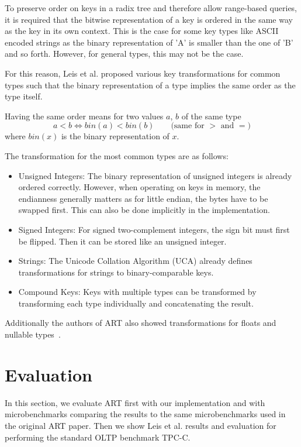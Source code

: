 \documentclass[acmtog, nonacm]{acmart}
\begin{document}
To preserve order on keys in a radix tree and therefore allow range-based queries, it is required that the bitwise representation of a key is 
ordered in the same way as the key in its own context. This is the case for some key types like ASCII encoded strings 
as the binary representation of 'A' is smaller than the one of 'B' and so forth. However, for general types, this may not be the case.

For this reason, Leis et al. proposed various key transformations for common types such that the binary 
representation of a type implies the same order as the type itself.

Having the same order means for two values $a$, $b$ of the same type
\[a < b \iff bin(a) <bin(b)\qquad\text{(same for $>$ and $=$)}\]
where $bin(x)$ is the binary representation of $x$.

The transformation for the most common types are as follows:
\begin{itemize}
    \item Unsigned Integers: The binary representation of unsigned integers is already ordered correctly. 
    However, when operating on keys in memory, the endianness generally matters as for little endian, the bytes 
    have to be swapped first. This can also be done implicitly in the implementation.
    \item Signed Integers: For signed two-complement integers, the sign bit must first be flipped. Then it can be 
    stored like an unsigned integer.
    \item Strings: The Unicode Collation Algorithm (UCA) already defines transformations for strings to 
    binary-comparable keys.
    \item Compound Keys: Keys with multiple types can be transformed by transforming each type individually and 
    concatenating the result.
\end{itemize}

Additionally the authors of ART also showed transformations for floats and nullable types~\cite{6544812}.

\section{Evaluation}

In this section, we evaluate ART first with our implementation and with microbenchmarks comparing the
results to the same microbenchmarks used in the original ART paper. Then we show Leis et al. results and evaluation 
for performing the
standard OLTP benchmark TPC-C.
\end{document}
